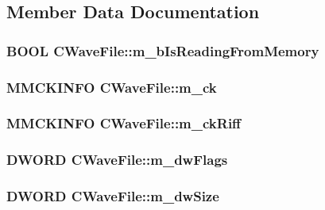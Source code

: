 \subsection{Member Data Documentation}
\hypertarget{class_c_wave_file_a0cffb36318ba8d1fa7998fbaad3369ea}{
\subsubsection[{m\_\-bIsReadingFromMemory}]{\setlength{\rightskip}{0pt plus 5cm}BOOL {\bf CWaveFile::m\_\-bIsReadingFromMemory}}}
\label{class_c_wave_file_a0cffb36318ba8d1fa7998fbaad3369ea}
\hypertarget{class_c_wave_file_aab9779a9fa7ba2d7da6a0212b1f2c33a}{
\subsubsection[{m\_\-ck}]{\setlength{\rightskip}{0pt plus 5cm}MMCKINFO {\bf CWaveFile::m\_\-ck}}}
\label{class_c_wave_file_aab9779a9fa7ba2d7da6a0212b1f2c33a}
\hypertarget{class_c_wave_file_aa18dcef80431faa12e36900136117e79}{
\subsubsection[{m\_\-ckRiff}]{\setlength{\rightskip}{0pt plus 5cm}MMCKINFO {\bf CWaveFile::m\_\-ckRiff}}}
\label{class_c_wave_file_aa18dcef80431faa12e36900136117e79}
\hypertarget{class_c_wave_file_a0d7fac94c4d49660080f9f77ad2606d2}{
\subsubsection[{m\_\-dwFlags}]{\setlength{\rightskip}{0pt plus 5cm}DWORD {\bf CWaveFile::m\_\-dwFlags}}}
\label{class_c_wave_file_a0d7fac94c4d49660080f9f77ad2606d2}
\hypertarget{class_c_wave_file_a1d9d2e7e77831165fcacebba1546fe32}{
\subsubsection[{m\_\-dwSize}]{\setlength{\rightskip}{0pt plus 5cm}DWORD {\bf CWaveFile::m\_\-dwSize}}}
